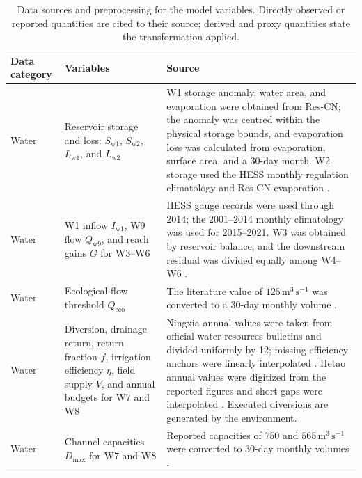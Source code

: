 \documentclass [a4paper,fleqn] {cas-dc}
\begin{document}
\begin{table}[t]
\caption{Data sources and preprocessing for the model variables. Directly observed or reported quantities are cited to their source; derived and proxy quantities state the transformation applied.}
\label{tab:data-sources}
\centering
\scriptsize
\renewcommand{\arraystretch}{1.00}
\begin{tabularx}{\textwidth}{@{}>{\raggedright\arraybackslash}p{}
  >{\raggedright\arraybackslash}p{}
  >{\raggedright\arraybackslash}X@{}}
\toprule
Data category & Variables & Source \\
\midrule
Water & Reservoir storage and loss: $S_{\mathrm{w1}}$, $S_{\mathrm{w2}}$,
$L_{\mathrm{w1}}$, and $L_{\mathrm{w2}}$ & W1 storage anomaly, water area,
and evaporation were obtained from Res-CN; the anomaly was centred within the
physical storage bounds, and evaporation loss was calculated from evaporation,
surface area, and a 30-day month. W2 storage used the HESS monthly regulation
climatology and Res-CN evaporation
\citep{Shen2023ResCN,Shen2022ResCNDataset,Yin2021YellowRiver,Yin2020YellowRiverDataset}. \\

Water & W1 inflow $I_{\mathrm{w1}}$, W9 flow $Q_{\mathrm{w9}}$, and reach gains
$G$ for W3--W6 & HESS gauge records were used through 2014; the 2001--2014
monthly climatology was used for 2015--2021. W3 was obtained by reservoir
balance, and the downstream residual was divided equally among W4--W6
\citep{Yin2021YellowRiver,Yin2020YellowRiverDataset,NingxiaWaterBulletins,Feng2025Hetao}. \\

Water & Ecological-flow threshold $Q_{\mathrm{eco}}$ & The literature value of
$125\,\mathrm{m^3\,s^{-1}}$ was converted to a 30-day monthly volume
\citep{Lu2021EcologicalFlow}. \\

Water & Diversion, drainage return, return fraction $f$, irrigation efficiency
$\eta$, field supply $V$, and annual budgets for W7 and W8 & Ningxia annual
values were taken from official water-resources bulletins and divided uniformly
by 12; missing efficiency anchors were linearly interpolated
\citep{NingxiaWaterBulletins,Meng2015NingxiaIrrigation}. Hetao annual values were
digitized from the reported figures and short gaps were interpolated
\citep{Feng2025Hetao}. Executed diversions are generated by the environment. \\

Water & Channel capacities $D_{\max}$ for W7 and W8 & Reported capacities of
$750$ and $565\,\mathrm{m^3\,s^{-1}}$ were converted to 30-day monthly volumes
\citep{NingxiaCanals2017,Liao2022CanalScheduling}. \\


\end{tabularx}
\end{table}
\end{document}

